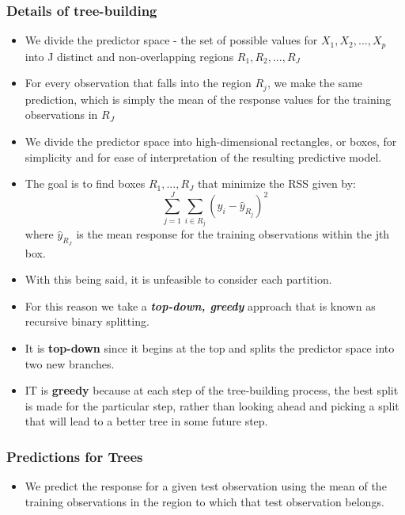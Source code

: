 \documentclass{article}
\begin{document}
\subsubsection{Details of tree-building}
\begin{itemize}
    \item We divide the predictor space - the set of possible values for $X_1, X_2, ..., X_p$ into J distinct and non-overlapping regions $R_1, R_2, ..., R_J$
    \item For every observation that falls into the region $R_j$, we make the same prediction, which is simply the mean of the response values for the training observations in $R_J$
    \item We divide the predictor space into high-dimensional rectangles, or boxes, for simplicity and for ease of interpretation of the resulting predictive model.
    \item The goal is to find boxes $R_1, ..., R_J$ that minimize the RSS given by:
    \begin{equation*}
        \sum_{j=1}^J \sum_{i\in R_j} (y_i - \hat{y}_{R_j})^2
    \end{equation*}
    where $\hat{y}_{R_J}$ is the mean response for the training observations within the jth box.
    \item With this being said, it is unfeasible to consider each partition.
    \item For this reason we take a \textbf{\textit{top-down, greedy}} approach that is known as recursive binary splitting.
    \item It is \textbf{top-down} since it begins at the top and splits the predictor space into two new branches.
    \item IT is \textbf{greedy} because at each step of the tree-building process, the best split is made for the particular step, rather than looking ahead and picking a split that will lead to a better tree in some future step.
\end{itemize}


\subsubsection{Predictions for Trees}
\begin{itemize}
    \item We predict the response for a given test observation using the mean of the training observations in the region to which that test observation belongs.
\end{itemize}
\end{document}
